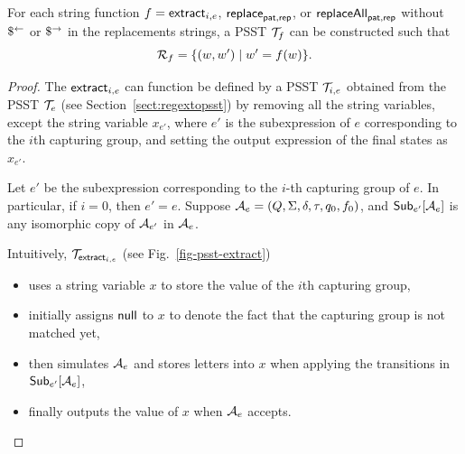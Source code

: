     \begin{lemma}
        For each string function $f = \mathsf{extract}_{i,e}$, $\mathsf{replace}_{\mathsf{pat}, \mathsf{rep}}$, or $\mathsf{replaceAll}_{\mathsf{pat}, \mathsf{rep}}$ without $\$^{\leftarrow}$ or $\$^{\rightarrow}$ in the replacements strings, a PSST $\mathcal{T}_f$ can be constructed such that
        $$\mathcal{R}_{f} = \{(w, w') \mid w'= f(w)\}.$$
    \end{lemma}
    \begin{proof}
    The $\mathsf{extract}_{i,e}$ can function be defined by a PSST $\mathcal{T}_{i,e}$ obtained from the PSST $\mathcal{T}_e$ (see Section~\ref{sect:regextopsst}) by removing all the string variables, except the string variable $x_{e'}$, where $e'$ is the subexpression of $e$ corresponding to the $i$th capturing group,  and setting the output expression of the final states as $x_{e'}$.

        Let $e'$ be the subexpression corresponding to the $i$-th capturing group of $e$. In particular, if $i=0$, then $e' = e$.
        Suppose $\mathcal{A}_e = (Q, \Sigma, \delta, \tau, q_0, f_0)$, and ${\sf Sub}_{e'}[\mathcal{A}_e]$ is any isomorphic copy of $\mathcal{A}_{e'}$ in $\mathcal{A}_e$.

        Intuitively, $\mathcal{T}_{\mathsf{extract}_{i,e}}$ (see Fig.~\ref{fig-psst-extract})
        \begin{itemize}
            \item uses a string variable $x$ to store the value of the $i$th capturing group,
            \item initially assigns $\mathsf{null}$ to $x$ to denote the fact that the capturing group is not matched yet,
            \item then simulates $\mathcal{A}_e$ and stores letters into $x$ when applying the transitions in ${\sf Sub}_{e'}[\mathcal{A}_e]$,
            \item finally outputs the value of $x$ when $\mathcal{A}_e$ accepts.
        \end{itemize}


\end{proof}
